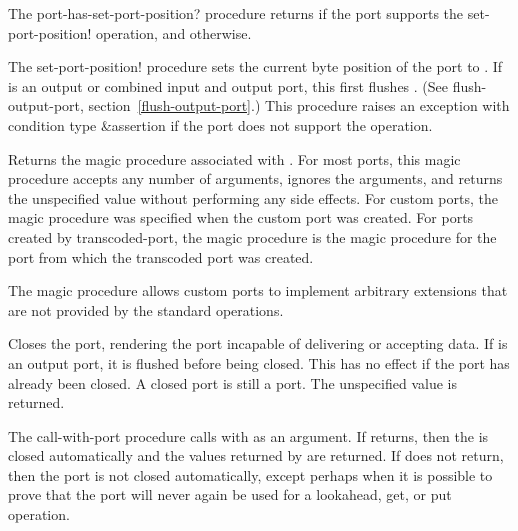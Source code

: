 \begin{entry}{%
}

   
The {\cf port-has-set-port-position?} procedure returns \schtrue{} if the port
supports the {\cf set-port-position!} operation, and \schfalse{}
otherwise.
   
The {\cf set-port-position!} procedure sets the current byte position
of the port to .  If  is an output or combined
input and output port, this first flushes .  (See {\cf
  flush-output-port}, section~\ref{flush-output-port}.)
This procedure raises an exception with condition type {\cf\&assertion}
if the port does not support the operation.
\end{entry}

\begin{entry}{%
}

Returns the magic procedure associated with .
For most ports, this magic procedure accepts any number of arguments,
ignores the arguments, and returns the unspecified value without
performing any side effects.
For custom ports, the magic procedure was specified when the
custom port was created.
For ports created by {\cf transcoded-port}, the magic procedure
is the magic procedure for the port from which the
transcoded port was created.

\begin{rationale}
The magic procedure allows custom ports to implement arbitrary
extensions that are not provided by the standard operations.
\end{rationale}
\end{entry}

\begin{entry}{%
}
   
Closes the port, rendering the port incapable of delivering or
accepting data. If  is an output port, it is flushed before
being closed.  This has no effect if the port has already been closed.
A closed port is still a port. The unspecified value is returned.
\end{entry}

\begin{entry}{%
}
   
  The {\cf call-with-port} procedure
calls  with  as an argument. If
 returns, then the  is closed automatically and
the values returned by  are returned. If  does not
return, then the port is not closed automatically, except perhaps when it is
possible to prove that the port will never again be used for a
{\cf lookahead}, {\cf get}, or {\cf put} operation.
\end{entry}

